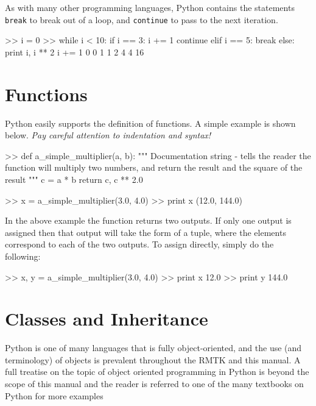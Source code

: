 As with many other programming languages, Python contains the statements \verb=break= to break out of a loop, and \verb=continue= to pass to the next iteration.

\begin{python}[frame=single]
>> i = 0
>> while i < 10:
       if i == 3:
           i += 1
           continue
       elif i == 5:
           break
       else:
           print i, i ** 2
       i += 1
0  0
1  1
2  4
4  16
\end{python}

\section{Functions}

Python easily supports the definition of functions. A simple example is shown below. \emph{Pay careful attention to indentation and syntax!}

\begin{python}[frame=single]
>> def a_simple_multiplier(a, b):
       """
       Documentation string - tells the reader the function 
       will multiply two numbers, and return the result and
       the square of the result
       """
       c = a * b
       return c, c ** 2.0

>> x = a_simple_multiplier(3.0, 4.0)
>> print x
(12.0, 144.0)
\end{python}

In the above example the function returns two outputs. If only one output is assigned then that output will take the form of a tuple, where the elements correspond to each of the two outputs. To assign directly, simply do the following:

\begin{python}[frame=single]
>> x, y = a_simple_multiplier(3.0, 4.0)
>> print x
12.0
>> print y
144.0
\end{python}

\section{Classes and Inheritance}

Python is one of many languages that is fully object-oriented, and the use (and terminology) of objects is prevalent throughout the RMTK and this manual. A full treatise on the topic of object oriented programming in Python is beyond the scope of this manual and the reader is referred to one of the many textbooks on Python for more examples

